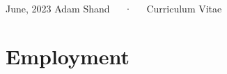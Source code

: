 \documentclass[11pt,a4paper,]{awesome-cv}
\begin{document}
\makecvheader

\makecvfooter
  {June, 2023}
    {Adam Shand~~~·~~~Curriculum Vitae}
  {\thepage}





\hypertarget{employment}{%
\section{Employment}\label{employment}}
\end{document}
